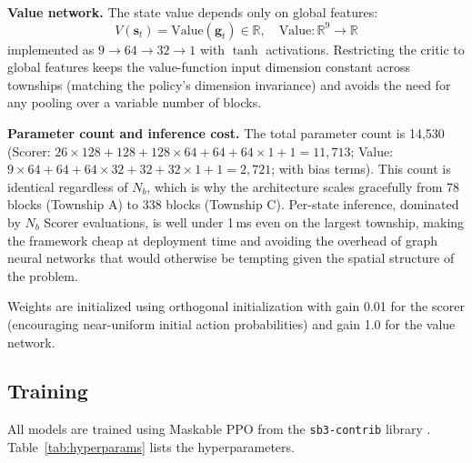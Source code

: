 \documentclass[preprint,12pt]{elsarticle}
\begin{document}
\textbf{Value network.} The state value depends only on global features:
\begin{equation}
V(\mathbf{s}_t) = \text{Value}(\mathbf{g}_t) \in \mathbb{R}, \quad \text{Value}: \mathbb{R}^{9} \to \mathbb{R}
\end{equation}
implemented as $9 \to 64 \to 32 \to 1$ with $\tanh$ activations. Restricting the critic to global features keeps the value-function input dimension constant across townships (matching the policy's dimension invariance) and avoids the need for any pooling over a variable number of blocks.

\textbf{Parameter count and inference cost.} The total parameter count is 14{,}530 (Scorer: $26 \times 128 + 128 + 128 \times 64 + 64 + 64 \times 1 + 1 = 11{,}713$; Value: $9 \times 64 + 64 + 64 \times 32 + 32 + 32 \times 1 + 1 = 2{,}721$; with bias terms). This count is identical regardless of $N_b$, which is why the architecture scales gracefully from 78 blocks (Township A) to 338 blocks (Township C). Per-state inference, dominated by $N_b$ Scorer evaluations, is well under 1\,ms even on the largest township, making the framework cheap at deployment time and avoiding the overhead of graph neural networks that would otherwise be tempting given the spatial structure of the problem.

Weights are initialized using orthogonal initialization \citep{saxe2014exact} with gain 0.01 for the scorer (encouraging near-uniform initial action probabilities) and gain 1.0 for the value network.

\subsection{Training}
\label{sec:training}

All models are trained using Maskable PPO from the \texttt{sb3-contrib} library \citep{huang2022closer}. Table~\ref{tab:hyperparams} lists the hyperparameters.
\end{document}
